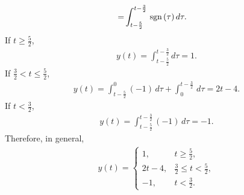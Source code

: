 \documentclass{assignment}
\begin{document}
\begin{sol}
\begin{itemize}
\begin{align}
            =&\int_{t-\frac{5}{2}}^{t-\frac{3}{2}}\,\text{sgn}\,(\tau)\,d\tau.
        \end{align}
        If $t\geq\frac{5}{2}$,
        \begin{align}
            y(t)=\int_{t-\frac{5}{2}}^{t-\frac{3}{2}}d\tau=1.
        \end{align}
        If $\frac{3}{2}<t\leq\frac{5}{2}$,
        \begin{align}
            y(t)=\int_{t-\frac{5}{2}}^0(-1)\,d\tau+\int_0^{t-\frac{3}{2}}\,d\tau=2t-4.
        \end{align}
        If $t<\frac{3}{2}$,
        \begin{align}
            y(t)=\int_{t-\frac{5}{2}}^{t-\frac{3}{2}}(-1)\,d\tau=-1.
        \end{align}
        Therefore, in general,
        \begin{align}
            y(t)=\left\{\begin{array}{ll}
                1,&t\geq\frac{5}{2},\\
                2t-4,&\frac{3}{2}\leq t<\frac{5}{2},\\
                -1,&t<\frac{3}{2}.
            \end{array}\right.
        \end{align}
    \end{itemize}
\end{sol}
\end{document}
